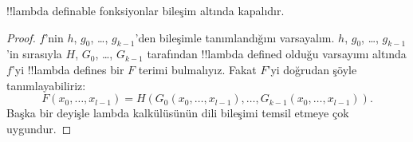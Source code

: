 \documentclass[../../../include/open-logic-section]{subfiles}
\begin{document}

\begin{lem}
!!{lambda definable} fonksiyonlar bileşim altında kapalıdır.
\end{lem}

\begin{proof}
$f$'nin $h$, $g_0$, \dots, $g_{k-1}$'den bileşimle tanımlandığını
varsayalım. $h$, $g_0$, \dots, $g_{k-1}$'in sırasıyla $H$, $G_0$, \dots,
$G_{k-1}$ tarafından !!{lambda defined} olduğu varsayımı altında $f$'yi
!!{lambda define}s bir $F$ terimi bulmalıyız. Fakat $F$'yi doğrudan şöyle
tanımlayabiliriz:
\[
F(x_0, \dots, x_{l-1}) = H(G_0(x_0, \dots, x_{l-1}),
\dots, G_{k-1}(x_0, \dots, x_{l-1})).
\]
Başka bir deyişle lambda kalkülüsünün dili bileşimi temsil etmeye çok
uygundur.
\end{proof}
\end{document}
